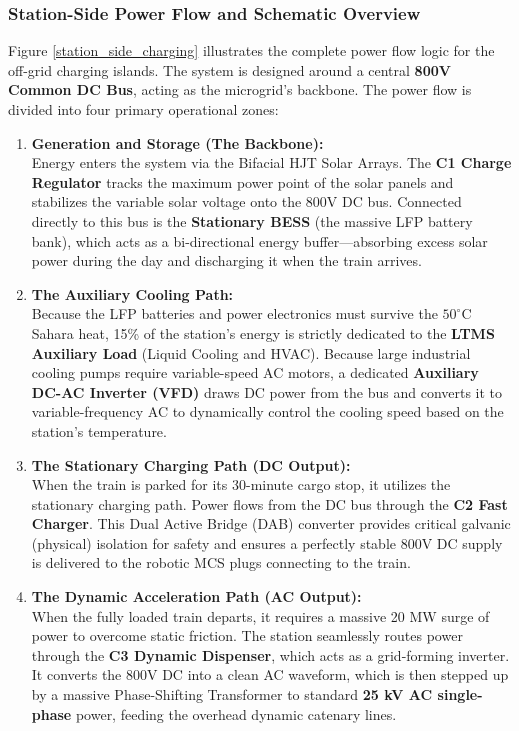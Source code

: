 \subsubsection*{Station-Side Power Flow and Schematic Overview}

Figure \ref{station_side_charging} illustrates the complete power flow logic for the off-grid charging islands. The system is designed around a central \textbf{800V Common DC Bus}, acting as the microgrid's backbone. The power flow is divided into four primary operational zones:

\begin{enumerate}
    \item \textbf{Generation and Storage (The Backbone):} \\
    Energy enters the system via the Bifacial HJT Solar Arrays. The \textbf{C1 Charge Regulator} tracks the maximum power point of the solar panels and stabilizes the variable solar voltage onto the 800V DC bus. Connected directly to this bus is the \textbf{Stationary BESS} (the massive LFP battery bank), which acts as a bi-directional energy buffer---absorbing excess solar power during the day and discharging it when the train arrives.

    \item \textbf{The Auxiliary Cooling Path:} \\
    Because the LFP batteries and power electronics must survive the $50^\circ$C Sahara heat, 15\% of the station's energy is strictly dedicated to the \textbf{LTMS Auxiliary Load} (Liquid Cooling and HVAC). Because large industrial cooling pumps require variable-speed AC motors, a dedicated \textbf{Auxiliary DC-AC Inverter (VFD)} draws DC power from the bus and converts it to variable-frequency AC to dynamically control the cooling speed based on the station's temperature.

    \item \textbf{The Stationary Charging Path (DC Output):} \\
    When the train is parked for its 30-minute cargo stop, it utilizes the stationary charging path. Power flows from the DC bus through the \textbf{C2 Fast Charger}. This Dual Active Bridge (DAB) converter provides critical galvanic (physical) isolation for safety and ensures a perfectly stable 800V DC supply is delivered to the robotic MCS plugs connecting to the train.

    \item \textbf{The Dynamic Acceleration Path (AC Output):} \\
    When the fully loaded train departs, it requires a massive 20 MW surge of power to overcome static friction. The station seamlessly routes power through the \textbf{C3 Dynamic Dispenser}, which acts as a grid-forming inverter. It converts the 800V DC into a clean AC waveform, which is then stepped up by a massive Phase-Shifting Transformer to standard \textbf{25 kV AC single-phase} power, feeding the overhead dynamic catenary lines.
\end{enumerate}

